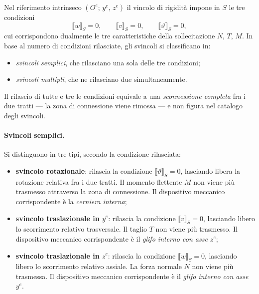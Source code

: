 Nel riferimento intrinseco $(O^e;\, y^e,\, z^e)$ il
vincolo di rigidità impone in $S$ le tre condizioni
\[
\llbracket w \rrbracket_S = 0, \qquad
\llbracket v \rrbracket_S = 0, \qquad
\llbracket \vartheta \rrbracket_S = 0,
\]
cui corrispondono dualmente le tre caratteristiche
della sollecitazione $N$, $T$, $M$. In base al numero
di condizioni rilasciate, gli svincoli si classificano
in:
\begin{itemize}[nosep]
	\item \emph{svincoli semplici}, che rilasciano una
	sola delle tre condizioni;
	\item \emph{svincoli multipli}, che ne rilasciano
	due simultaneamente.
\end{itemize}
Il rilascio di tutte e tre le condizioni equivale a una
\emph{sconnessione completa} fra i due tratti --- la
zona di connessione viene rimossa --- e non figura nel
catalogo degli svincoli.

\paragraph{Svincoli semplici.}
Si distinguono in tre tipi, secondo la condizione
rilasciata:
\begin{itemize}[nosep]
	\item \textbf{svincolo rotazionale}: rilascia la
	condizione $\llbracket\vartheta\rrbracket_S = 0$,
	lasciando libera la rotazione relativa fra i due
	tratti. Il momento flettente $M$ non viene più
	trasmesso attraverso la zona di connessione. Il
	dispositivo meccanico corrispondente è la
	\emph{cerniera interna};
	\item \textbf{svincolo traslazionale in $y^e$}:
	rilascia la condizione $\llbracket v \rrbracket_S = 0$,
	lasciando libero lo scorrimento relativo trasversale.
	Il taglio $T$ non viene più trasmesso. Il dispositivo
	meccanico corrispondente è il \emph{glifo interno
		con asse $z^e$};
	\item \textbf{svincolo traslazionale in $z^e$}:
	rilascia la condizione $\llbracket w \rrbracket_S = 0$,
	lasciando libero lo scorrimento relativo assiale.
	La forza normale $N$ non viene più trasmessa. Il
	dispositivo meccanico corrispondente è il
	\emph{glifo interno con asse $y^e$}.
\end{itemize}

